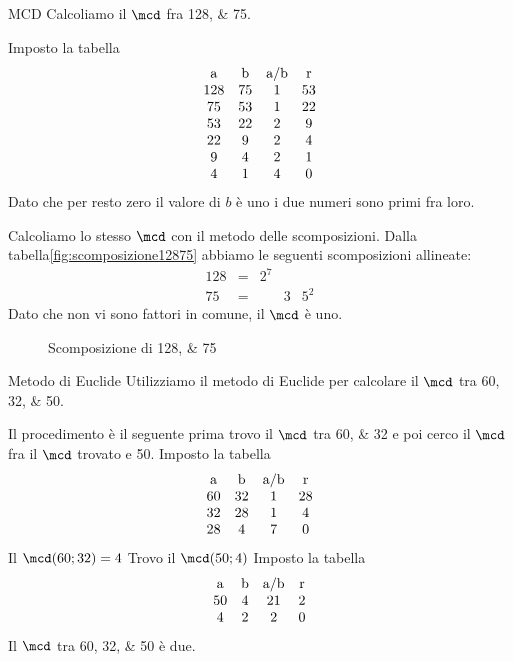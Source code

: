 \begin{esempiot}{MCD}{}
Calcoliamo il $\mcd$ fra \numlist{128;75}. 
   \end{esempiot}
Imposto la tabella
  \[
   \begin{array}{cccc}
   	   $a$&$b$&$a/b$&$r$\\
   	   	128 & 75 & 1 & 53\\
   	   	75 & 53 & 1 & 22\\
   	   	53 & 22 & 2 & 9\\
   	   	22 & 9 &2 & 4\\
   	   	9 & 4 & 2 & 1\\
   	   	4 & 1 & 4& 0
   	    \end{array} 
   	     \]
   	    Dato che per resto zero il valore di $b$ è uno i due numeri sono primi fra loro. 
   	    
   	    Calcoliamo lo stesso $\mcd$ con il metodo delle scomposizioni. 
   	    Dalla tabella\nobs\vref{fig:scomposizione12875} abbiamo le seguenti scomposizioni allineate:
   	      \[
   	       \begin{array}{rclll}
   	       128& = & 2^7&   &    \\
   	       75 & = &    & 3 & 5^2 
   	       \end{array}
   	       \]
   	  Dato che non vi sono fattori in comune, il $\mcd$ è uno.
  \begin{figure}
   	        	\centering
   	    
   	        	\caption[]{Scomposizione di \numlist{128;75}}
   	        	\label{fig:scomposizione12875}
   	        \end{figure}
\begin{esempiot}{Metodo di Euclide}{}
Utilizziamo il metodo di Euclide per calcolare il $\mcd$ tra \numlist{60;32;50}. 
\end{esempiot}
Il procedimento è il seguente prima trovo il $\mcd$ tra \numlist{60;32} e poi cerco il $\mcd$ fra il $\mcd$ trovato e \num{50}.
Imposto la tabella
  \[
   \begin{array}{cccc}
   	   $a$&$b$&$a/b$&$r$\\
   	   	60 & 32 & 1 & 28\\
   	   	32 & 28 & 1 & 4\\
   	   	28 & 4 & 7 & 0
   	   \end{array} 
   	     \]
   Il $\mcd(60;32)=4$
 Trovo il $\mcd(50;4)$
 Imposto la tabella
   \[
     \begin{array}{cccc}
     	   $a$&$b$&$a/b$&$r$\\
     	   	50 & 4 & 21 & 2\\
     	   	4 & 2 & 2 & 0
     	   \end{array} 
     	     \]
     Il $\mcd$ tra \numlist{60;32;50} è due.
